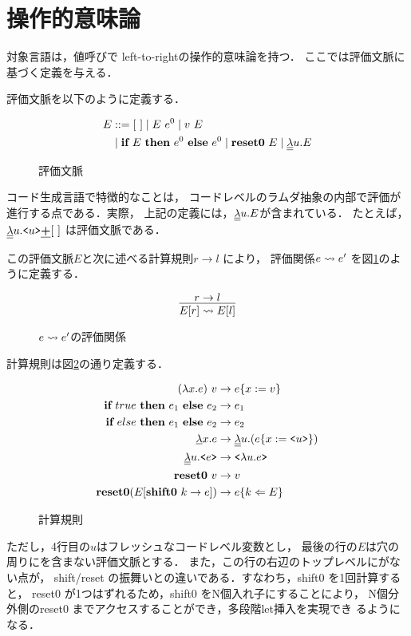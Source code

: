 \section{操作的意味論}

対象言語は，値呼びで left-to-rightの操作的意味論を持つ．
ここでは評価文脈に基づく定義を与える．

評価文脈を以下のように定義する．
\begin{figure}[H]
  \centering
  \begin{align*}
    E & ::= [~] \mid E~ e^0 \mid v~ E \\
      & \mid \textbf{if}~{E}~\textbf{then}~{e^0}~\textbf{else}~{e^0} \mid \textbf{reset0}~ E \mid \underline{\underline{\lambda}}{u}.{E}
  \end{align*}
  \caption{評価文脈}
\end{figure}

コード生成言語で特徴的なことは，
コードレベルのラムダ抽象の内部で評価が進行する点である．実際，
上記の定義には，$\underline{\underline{\lambda}}{u}.{E}$が含まれている．
たとえば，$\underline{\underline{\lambda}}{u}.{\texttt{<}{u}\texttt{>} \underline{\textbf{+}} [~]}$ は評価文脈である．

この評価文脈$E$と次に述べる計算規則$r \to l$ により，
評価関係$e \leadsto e'$ を図\ref{fig:etoe}のように定義する．

\begin{figure}[H]
  \centering
  \[
    \infer{E[r] \lto E[l]}{r \to l}
  \]
  \caption{$e \leadsto e' $の評価関係}
  \label{fig:etoe}
\end{figure}


計算規則は図\ref{fig:calc_rule}の通り定義する．
\begin{figure}[H]
  \centering
  \begin{align*}
    (\lambda{x}.{e})~v &\to e\{ x := v \} \\
    \textbf{if}~{true}~\textbf{then}~{e_1}~\textbf{else}~{e_2} &\to e_1 \\
    \textbf{if}~{else}~\textbf{then}~{e_1}~\textbf{else}~{e_2} &\to e_2 \\
    \underline{\lambda}{x}.{e} &\to \underline{\underline{\lambda}}{u}.{(e\{ x := \texttt{<}{u}\texttt{>} \})} \\
    \underline{\underline{\lambda}}{u}.{\texttt{<}{e}\texttt{>}} &\to \texttt{<}{\lambda{u}.{e}}\texttt{>} \\
    \textbf{reset0}~ v &\to v \\
    \textbf{reset0} (E[\textbf{shift0}~ k \to e]) &\to e \{{k}\Leftarrow{E}\}
  \end{align*}
  \caption{計算規則}
  \label{fig:calc_rule}
\end{figure}

ただし，4行目の$u$はフレッシュなコードレベル変数とし，
最後の行の$E$は穴の周りに{\Resetz}を含まない評価文脈とする．
また，この行の右辺のトップレベルに{\Resetz}がない点が，
shift/reset の振舞いとの違いである．すなわち，shift0 を1回計算すると，
reset0 が1つはずれるため，shift0 をN個入れ子にすることにより，
N個分外側のreset0 までアクセスすることができ，多段階let挿入を実現でき
るようになる．

